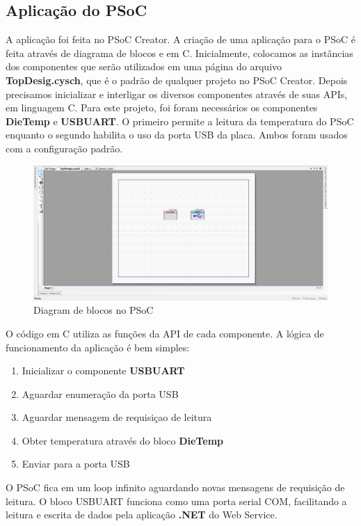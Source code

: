 \documentclass[a4paper,12pt,titlepage]{article}
\begin{document}
	\subsection{Aplicação do PSoC}
		A aplicação foi feita no PSoC Creator. A criação de uma aplicação para o PSoC é feita através de diagrama de blocos e em C. Inicialmente, colocamos as instâncias dos componentes que serão utilizados em uma página do arquivo \textbf{TopDesig.cysch}, que é o padrão de qualquer projeto no PSoC Creator. Depois precisamos inicializar e interligar os diversos componentes através de suas APIs, em linguagem C. Para este projeto, foi foram necessários os componentes \textbf{DieTemp} e \textbf{USBUART}. O primeiro permite a leitura da temperatura do PSoC enquanto o segundo habilita o uso da porta USB da placa. Ambos foram usados com a configuração padrão.
			\begin{figure}[h!]
				\centering
				\includegraphics[width=1\linewidth]{psoc1}
				\caption{Diagram de blocos no PSoC}
				\label{fig:psoc1}
			\end{figure}
		
		O código em C utiliza as funções da API de cada componente. A lógica de funcionamento da aplicação é bem simples:
			\begin{enumerate}
				\item Inicializar o componente \textbf{USBUART}
				\item Aguardar enumeração da porta USB
				\item Aguardar mensagem de requisiçao de leitura
				\item Obter temperatura através do bloco \textbf{DieTemp}
				\item Enviar para a porta USB				  
			\end{enumerate}
		O PSoC fica em um loop infinito aguardando novas mensagens de requisição de leitura. O bloco USBUART funciona como uma porta serial COM, facilitando a leitura e escrita de dados pela aplicação \textbf{.NET} do Web Service. 
		
\end{document}
